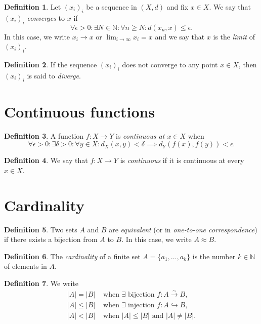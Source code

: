 \documentclass{article}
\theoremstyle{definition}
\newtheorem{definition}{Definition}
\newcommand{\N}{\mathbb{N}}
\begin{document}
\begin{definition}
	Let $(x_i)_i$ be a sequence in $(X,d)$ and fix $x\in X$. We say that $(x_i)_i$ \emph{converges} to $x$ if
	\[
		\forall \epsilon>0 : \exists N\in \N : \forall n\geq N : d(x_n,x) \leq \epsilon.
	\]
	In this case, we write $x_i\to x$ or $\displaystyle\lim_{i\to\infty}x_i = x$ and we say that $x$ is the \emph{limit} of $(x_i)_i$.
\end{definition}

\begin{definition}
	If the sequence $(x_i)_i$ does not converge to any point $x\in X$, then $(x_i)_i$ is said to \emph{diverge}.
\end{definition}


\section*{Continuous functions}

\begin{definition}
	A function $f:X\to Y$ is \emph{continuous at $x\in X$} when
	\[
		\forall \epsilon>0 : \exists \delta>0 : \forall y\in X : d_X(x,y) <\delta \implies d_Y(f(x),f(y)) <\epsilon.
	\]
\end{definition}

\begin{definition}
	We say that $f:X\to Y$ is \emph{continuous} if it is continuous at every $x\in X$.
\end{definition}


\section*{Cardinality}

\begin{definition}
	Two sets $A$ and $B$ are \emph{equivalent} (or in \emph{one-to-one correspondence}) if there exists a bijection from $A$ to $B$. In this case, we write $A\approx B$.
\end{definition}

\begin{definition}
	The \emph{cardinality} of a finite set $A=\{a_1,\ldots, a_k\}$ is the number $k\in\N$ of elements in $A$.
\end{definition}

\begin{definition}
	We write
	\begin{align*}
		|A| = |B|	&\text{ when } \exists \text{ bijection }f:A\xrightarrow{\sim} B,		\\[2pt]
		|A| \leq |B|	&\text{ when } \exists \text{ injection }f:A\hookrightarrow B,			\\[2pt]
		|A| < |B|	&\text{ when } |A|\leq |B| \text{ and } |A|\neq|B|.
	\end{align*}
\end{definition}
\end{document}
